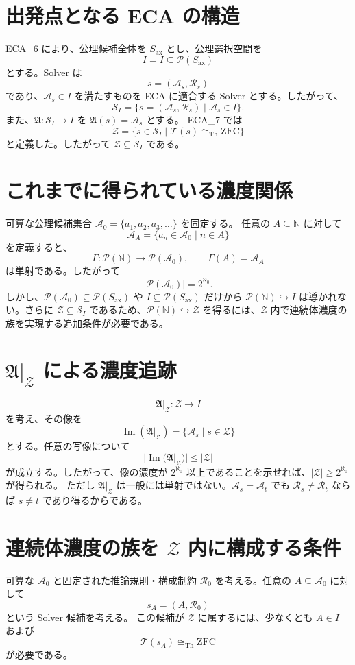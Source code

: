 \documentclass[a4paper,11pt]{article}
\newcommand{\Solver}{\mathcal{S}}
\newcommand{\Ax}{S_{\mathrm{ax}}}
\newcommand{\Sel}{I}
\newcommand{\Pow}{\mathcal{P}}
\begin{document}
\section{出発点となる ECA の構造}
ECA_6 により、公理候補全体を $\Ax$ とし、公理選択空間を
\[
\Sel=I\subseteq\Pow(\Ax)
\]
とする。Solver は
\[
\boxed{s=(\mathcal{A}_s,\mathcal{R}_s)}
\]
であり、$\mathcal{A}_s\in I$ を満たすものを ECA に適合する Solver とする。したがって、
\[
\Solver_I=\{s=(\mathcal{A}_s,\mathcal{R}_s)\mid\mathcal{A}_s\in I\}.
\]
また、$\mathfrak{A}:\Solver_I\to I$ を $\mathfrak{A}(s)=\mathcal{A}_s$ とする。
ECA_7 では
\[
\boxed{\mathcal{Z}=\{s\in\Solver_I\mid\mathcal{T}(s)\cong_{\mathrm{Th}}\mathrm{ZFC}\}}
\]
と定義した。したがって $\mathcal{Z}\subseteq\Solver_I$ である。

\section{これまでに得られている濃度関係}
可算な公理候補集合 $\mathcal{A}_0=\{a_1,a_2,a_3,\ldots\}$ を固定する。
任意の $A\subseteq\mathbb{N}$ に対して
\[
\mathcal{A}_A=\{a_n\in\mathcal{A}_0\mid n\in A\}
\]
を定義すると、
\[
\Gamma:\Pow(\mathbb{N})\to\Pow(\mathcal{A}_0),\qquad \Gamma(A)=\mathcal{A}_A
\]
は単射である。したがって
\[
|\Pow(\mathcal{A}_0)|=2^{\aleph_0}.
\]
しかし、$\Pow(\mathcal{A}_0)\subseteq\Pow(\Ax)$ や $I\subseteq\Pow(\Ax)$ だけから $\Pow(\mathbb{N})\hookrightarrow I$ は導かれない。さらに $\mathcal{Z}\subseteq\Solver_I$ であるため、$\Pow(\mathbb{N})\hookrightarrow\mathcal{Z}$ を得るには、$\mathcal{Z}$ 内で連続体濃度の族を実現する追加条件が必要である。

\section{$\mathfrak{A}|_{\mathcal{Z}}$ による濃度追跡}
\[
\boxed{\mathfrak{A}|_{\mathcal{Z}}:\mathcal{Z}\to I}
\]
を考え、その像を
\[
\operatorname{Im}(\mathfrak{A}|_{\mathcal{Z}})=\{\mathcal{A}_s\mid s\in\mathcal{Z}\}
\]
とする。任意の写像について
\[
|\operatorname{Im}(\mathfrak{A}|_{\mathcal{Z}})|\leq|\mathcal{Z}|
\]
が成立する。したがって、像の濃度が $2^{\aleph_0}$ 以上であることを示せれば、$|\mathcal{Z}|\geq2^{\aleph_0}$ が得られる。
ただし $\mathfrak{A}|_{\mathcal{Z}}$ は一般には単射ではない。$\mathcal{A}_s=\mathcal{A}_t$ でも $\mathcal{R}_s\neq\mathcal{R}_t$ ならば $s\neq t$ であり得るからである。

\section{連続体濃度の族を $\mathcal{Z}$ 内に構成する条件}
可算な $\mathcal{A}_0$ と固定された推論規則・構成制約 $\mathcal{R}_0$ を考える。任意の $A\subseteq\mathcal{A}_0$ に対して
\[
s_A=(A,\mathcal{R}_0)
\]
という Solver 候補を考える。
この候補が $\mathcal{Z}$ に属するには、少なくとも $A\in I$ および
\[
\mathcal{T}(s_A)\cong_{\mathrm{Th}}\mathrm{ZFC}
\]
が必要である。
\end{document}

